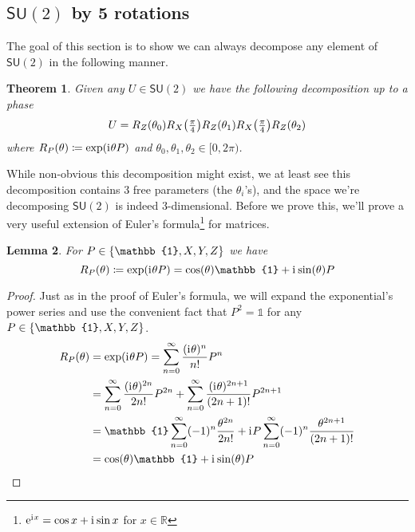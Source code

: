 \documentclass[12pt,dvipsnames]{article}
\newcommand{\SU}[1]{\mathsf{SU} (#1)}
\newcommand{\R}{\mathbb{R}}
\newcommand{\1}{\mathbb{1}}
\newcommand{\iu}{\mathrm{i}\mkern1mu}
\newcommand{\e}{\mathrm{e}}
\newcommand{\defeq}{\coloneqq}
\theoremstyle{plain}
\newtheorem{theorem}{Theorem}[section]
\newtheorem{lem}[theorem]{Lemma}
\begin{document}
\subsection{$\SU{2}$ by 5 rotations}

The goal of this section is to show we can always decompose any element of $\SU{2}$ in the following manner.
\begin{theorem}
    Given any $U\in\SU{2}$ we have the following decomposition up to a phase
    \begin{equation*}
        U = R_Z(\theta_0)R_X\qty(\tfrac{\pi}{4})R_Z(\theta_1)R_X\qty(\tfrac{\pi}{4})R_Z(\theta_2)
    \end{equation*}
    where $R_P(\theta) \defeq \exp(\iu \theta P)$ and $\theta_0, \theta_1, \theta_2\in[0, 2\pi)$.
\end{theorem}
While non-obvious this decomposition might exist, we at least see this decomposition contains 3 free parameters (the $\theta_i$'s), and the space we're decomposing $\SU{2}$ is indeed 3-dimensional.
Before we prove this, we'll prove a very useful extension of Euler's formula\footnote{$\e^{\iu x} = \cos{x} + \iu\sin{x}$ for $x\in\R$} for matrices.
\begin{lem}
    For $P\in \qty{\1, X, Y, Z}$ we have
    \begin{equation*}
        R_P(\theta) \defeq \exp(\iu\theta P) = \cos(\theta) \1 + \iu\sin(\theta) P
    \end{equation*}
\end{lem}
\begin{proof}
    Just as in the proof of Euler's formula, we will expand the exponential's power series and use the convenient fact that $P^2 = \1$ for any $P\in\qty{\1, X, Y, Z}$.
    \begin{align*}
        R_P(\theta) & = \exp(\iu\theta P) = \sum_{n = 0}^\infty\frac{(\iu \theta)^n}{n!}P^n                                                     \\
                    & = \sum_{n = 0}^\infty\frac{(\iu \theta)^{2n}}{2n!}P^{2n} + \sum_{n = 0}^\infty\frac{(\iu \theta)^{2n+1}}{(2n+1)!}P^{2n+1} \\
                    & = \1\sum_{n = 0}^\infty (-1)^n\frac{\theta^{2n}}{2n!} + \iu P\sum_{n = 0}^\infty (-1)^n\frac{\theta^{2n+1}}{(2n+1)!}      \\
                    & = \cos(\theta)\1 + \iu\sin(\theta)P
    \end{align*}
\end{proof}
\end{document}
